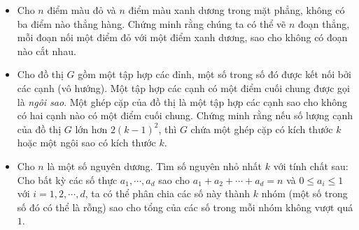 \documentclass[11pt]{scrartcl}
\begin{document}
\begin{itemize}[label=, leftmargin=0em, itemsep=-0em]
    \item \begin{btvn}
        Cho $n$ điểm màu đỏ và $n$ điểm màu xanh dương trong mặt phẳng, không có ba điểm nào thẳng hàng. Chứng minh rằng chúng ta có thể vẽ $n$ đoạn thẳng, mỗi đoạn nối một điểm đỏ với một điểm xanh dương, sao cho không có đoạn nào cắt nhau.
    \end{btvn}

    \item \begin{btvn}
        Cho đồ thị $G$ gồm một tập hợp các đỉnh, một số trong số đó được kết nối bởi các cạnh (vô hướng). Một tập hợp các cạnh có một điểm cuối chung được gọi là \textit{ngôi sao}. Một ghép cặp của đồ thị là một tập hợp các cạnh sao cho không có hai cạnh nào có một điểm cuối chung. Chứng minh rằng nếu số lượng cạnh của đồ thị $G$ lớn hơn $2(k-1)^2$, thì $G$ chứa một ghép cặp có kích thước $k$ hoặc một ngôi sao có kích thước $k$.
    \end{btvn}

    \item \begin{btvn}
        Cho $n$ là một số nguyên dương. Tìm số nguyên nhỏ nhất $k$ với tính chất sau: Cho bất kỳ các số thực $a_1 , \cdots , a_d $ sao cho $a_1 + a_2 + \cdots + a_d = n$ và $0 \le a_i \le 1$ với $i=1,2,\cdots ,d$, ta có thể phân chia các số này thành $k$ nhóm (một số trong số đó có thể là rỗng) sao cho tổng của các số trong mỗi nhóm không vượt quá $1$.
    \end{btvn}


\end{itemize}
\end{document}
